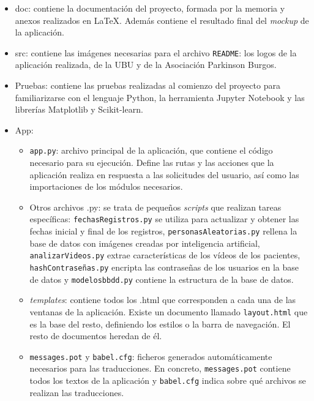 \begin{itemize}
    \item doc: contiene la documentación del proyecto, formada por la memoria y anexos realizados en \LaTeX{}. Además contiene el resultado final del \textit{mockup} de la aplicación.

    \item src: contiene las imágenes necesarias para el archivo \texttt{README}: los logos de la aplicación realizada, de la UBU y de la Asociación Parkinson Burgos.

    \item Pruebas: contiene las pruebas realizadas al comienzo del proyecto para familiarizarse con el lenguaje Python, la herramienta Jupyter Notebook y las librerías Matplotlib y Scikit-learn. 
    
    \item App:
        \begin{itemize}
            \item \texttt{app.py}: archivo principal de la aplicación, que contiene el código necesario para su ejecución. Define las rutas y las acciones que la aplicación realiza en respuesta a las solicitudes del usuario, así como las importaciones de los módulos necesarios.
            
            \item Otros archivos .py: se trata de pequeños \textit{scripts} que realizan tareas específicas: \texttt{fechasRegistros.py} se utiliza para actualizar y obtener las fechas inicial y final de los registros, \texttt{personasAleatorias.py} rellena la base de datos con imágenes creadas por inteligencia artificial, \texttt{analizarVideos.py} extrae características de los vídeos de los pacientes, \texttt{hashContraseñas.py} encripta las contraseñas de los usuarios en la base de datos  y \texttt{modelosbbdd.py} contiene la estructura de la base de datos.
            
            \item \textit{templates}: contiene todos los .html que corresponden a cada una de las ventanas de la aplicación. Existe un documento llamado \texttt{layout.html} que es la base del resto, definiendo los estilos o la barra de navegación. El resto de documentos heredan de él.
            
            \item \texttt{messages.pot} y \texttt{babel.cfg}: ficheros generados automáticamente necesarios para las traducciones. En concreto, \texttt{messages.pot} contiene todos los textos de la aplicación y \texttt{babel.cfg} indica sobre qué archivos se realizan las traducciones.
            

\end{itemize}
\end{itemize}
